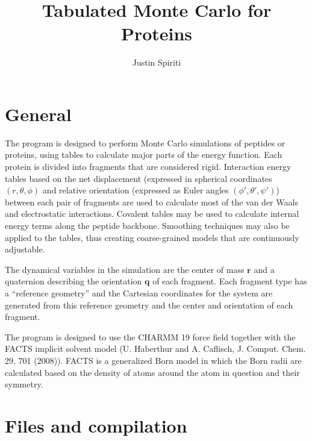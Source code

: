 \documentclass{article}      %
\title{Tabulated Monte Carlo for Proteins}  %
\author{Justin Spiriti}      %
\begin{document}

\maketitle                   %

\section{General}

The program is designed to perform Monte Carlo simulations of peptides or proteins, using tables to calculate major parts of the energy function.  Each protein is divided into fragments that are considered rigid.  Interaction energy tables based on the net displacement (expressed in spherical coordinates $(r,\theta,\phi)$ and relative orientation (expressed as Euler angles $(\phi',\theta',\psi')$) between each pair of fragments are used to calculate most of the van der Waals and electrostatic interactions.  Covalent tables may be used to calculate internal energy terms along the peptide backbone.  Smoothing techniques may also be applied to the tables, thus creating coarse-grained models that are continuously adjustable.  

The dynamical variables in the simulation are the center of mass  $\mathbf{r}$ and a quaternion describing the orientation $\mathbf{q}$ of each fragment.  Each fragment type has a ``reference geometry'' and the Cartesian coordinates for the system are generated from this reference geometry and the center and orientation of each fragment.    

The program is designed to use the CHARMM 19 force field together with the FACTS implicit solvent model (U. Haberthur and A. Caflisch, J. Comput. Chem. 29, 701 (2008)).  FACTS is a generalized Born model in which the Born radii are calculated based on the density of atoms around the atom in question and their symmetry.  

\section{Files and compilation}
\end{document}
